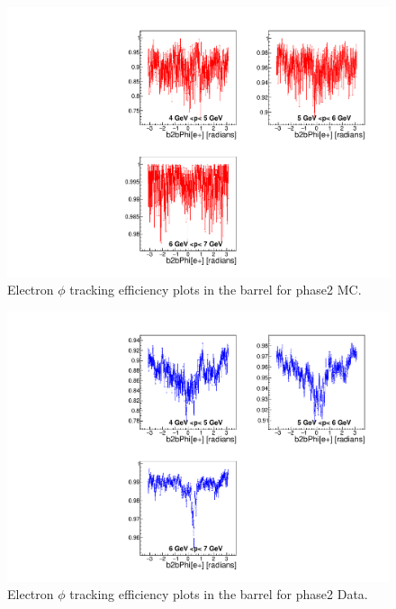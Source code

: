 \documentclass[a4paper,11pt,twosided,final,german,openbib,pdftex,listof=totoc,bibliography=totoc]{scrbook}
\begin{document}
\begin{appendix}






\begin{figure}[!htbp]
	\centering
	\includegraphics[width=\textwidth]{Plots/master/xPMPhiemBarrel_MC}
	\caption[Momentum $\phi$ Electron Barrel Efficiency Phase2 MC]{Electron $\phi$ tracking efficiency plots in the barrel for phase2 MC.}
	\label{plt:PMPhiemBarrel_MC}
\end{figure}


\begin{figure}[!htbp]
	\centering
	\includegraphics[width=\textwidth]{Plots/master/xPMPhiemBarrel_Data}
	\caption[Momentum $\phi$ Electron Barrel Efficiency Phase2 Data]{Electron $\phi$ tracking efficiency plots in the barrel for phase2 Data.}
	\label{plt:PMPhiemBarrel_Data}
\end{figure}







\end{appendix}
\end{document}
